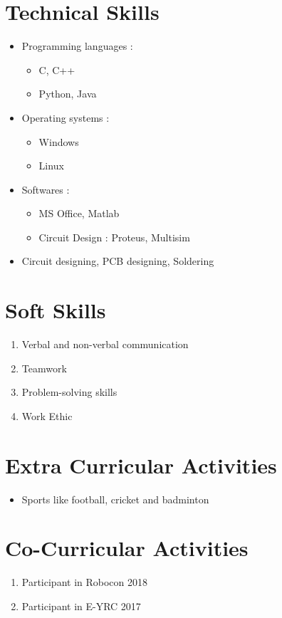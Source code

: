 \documentclass[margin,line]{res}
\begin{document}
\begin{resume}
\section{\sc Technical Skills}
\begin{itemize}
	\item Programming languages : 
	\begin{itemize}
		\item C, C++
		\item Python, Java
	\end{itemize}
	\item Operating systems : 
	\begin{itemize}
		\item Windows
		\item Linux
	\end{itemize}
	\item Softwares :
	\begin{itemize}
		 \item MS Office, Matlab
		\item Circuit Design : Proteus, Multisim
	\end{itemize}
	\item Circuit designing, PCB designing, Soldering
\end{itemize}

\section{\sc Soft Skills}
\begin{enumerate}
	\item Verbal and non-verbal communication
	\item Teamwork
	\item Problem-solving skills
	\item Work Ethic
\end{enumerate}

\section{\sc Extra Curricular Activities}
\begin{itemize}
	\item Sports like football, cricket and badminton
\end{itemize}

\section{\sc Co-Curricular Activities}
\begin{enumerate}
	\item Participant in Robocon 2018 
	\item Participant in E-YRC 2017
\end{enumerate}

\end{resume}
\end{document}
